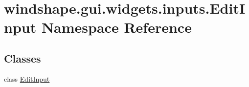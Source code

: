 \hypertarget{namespacewindshape_1_1gui_1_1widgets_1_1inputs_1_1_edit_input}{}\section{windshape.\+gui.\+widgets.\+inputs.\+Edit\+Input Namespace Reference}
\label{namespacewindshape_1_1gui_1_1widgets_1_1inputs_1_1_edit_input}
\subsection*{Classes}
\begin{DoxyCompactItemize}
\item 
class \mbox{\hyperlink{classwindshape_1_1gui_1_1widgets_1_1inputs_1_1_edit_input_1_1_edit_input}{Edit\+Input}}
\end{DoxyCompactItemize}
